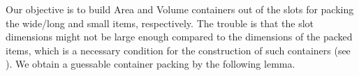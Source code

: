\documentclass[10pt,a4paper]{amsart}
\newcommand{\eps}{\varepsilon}
\renewcommand{\epsilon}{\varepsilon} %
\theoremstyle{definition}
\begin{document}
%     

Our objective is to build Area and Volume containers out of the slots for packing the wide/long and small items, respectively. The trouble is that the slot dimensions might not be large enough compared to the dimensions of the packed items, which is a necessary condition for the construction of such containers (see ). 
We obtain a guessable container packing by the following lemma.

\end{document}
